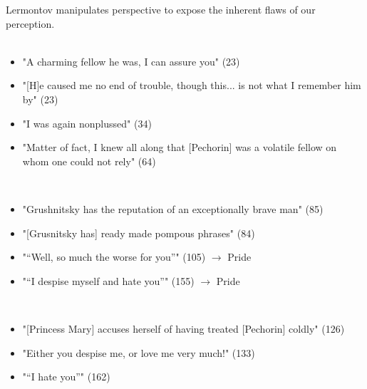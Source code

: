 \documentclass[12pt]{article}
\begin{document}
    Lermontov manipulates perspective to expose the inherent flaws of our perception.\\

    \\

    \begin{itemize}
        \item "A charming fellow he was, I can assure you" (23)
        \item "[H]e caused me no end of trouble, though this... is not what I
        remember him by" (23)
        \item "I was again nonplussed" (34)
        \item "Matter of fact, I knew all along that [Pechorin] was a volatile fellow
        on whom one could not rely" (64)
    \end{itemize}

    \\

    \begin{itemize}
        \item "Grushnitsky has the reputation of an exceptionally brave man" (85)
        \item "[Grusnitsky has] ready made pompous phrases" (84)
        \item "\enquote{Well, so much the worse for you}" (105) \(\to\) Pride
        \item "\enquote{I despise myself and hate you}" (155) \(\to\) Pride
    \end{itemize}

    \\

    \begin{itemize}
        \item "[Princess Mary] accuses herself of having treated [Pechorin] coldly" (126)
        \item "Either you despise me, or love me very much!" (133)
        \item "\enquote{I hate you}" (162)
    \end{itemize}
\end{document}
